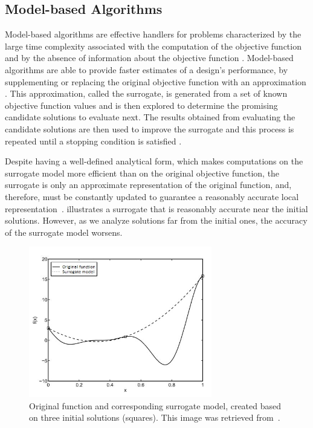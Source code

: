 	\subsection{Model-based Algorithms}
	\label{ssec:model-based}
	Model-based algorithms are effective handlers for problems characterized by the large time complexity associated with the computation of the objective function and by the absence of information about the objective function \cite{Forrester2009SBO}. Model-based algorithms are able to provide faster estimates of a design’s performance, by supplementing or replacing the original objective function with an approximation \cite{Wortmann2016BBO}. This approximation, called the surrogate, is generated from a set of known objective function values and is then explored to determine the promising candidate solutions to evaluate next. The results obtained from evaluating the candidate solutions are then used to improve the surrogate and this process is repeated until a stopping condition is satisfied \cite{Koziel2011}.
	
	Despite having a well-defined analytical form, which makes computations on the surrogate model more efficient than on the original objective function, the surrogate is only an approximate representation of the original function, and, therefore, must be constantly updated to guarantee a reasonably accurate local representation~\cite{Koziel2011}.  illustrates a surrogate that is reasonably accurate near the initial solutions. However, as we analyze solutions far from the initial ones, the accuracy of the surrogate model worsens.
	\begin{figure}[h!]
		\centering
		\includegraphics[width=8cm]{Images/Background/sbosexample.JPG}
		\caption[Example of a surrogate model]{Original function and corresponding surrogate model, created based on three initial solutions (squares). This image was retrieved from~\cite{Koziel2011}.}
		\label{fig:sbosexample}
	\end{figure}
	
